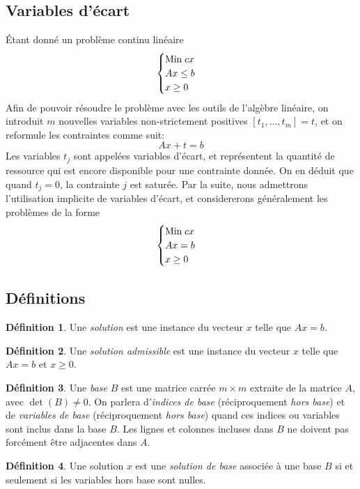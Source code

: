 \documentclass[a4paper]{report}
\theoremstyle{definition}
\newtheorem*{definition}{Définition}
\theoremstyle{remark}
\theoremstyle{plain}
\begin{document}
\subsection{Variables d'écart}
Étant donné un problème continu linéaire
\[\begin{cases}
\text{Min\;} cx \\
Ax \le b \\
x \ge 0
\end{cases}\]
Afin de pouvoir résoudre le problème avec les outils de l'algèbre linéaire, on
introduit \(m\) nouvelles variables non-strictement positives
\([t_1,\dots,t_m]=t\), et on reformule les contraintes comme suit:
\[Ax+t=b\]
Les variables \(t_j\) sont appelées variables d'écart, et représentent la
quantité de ressource qui est encore disponible pour une contrainte donnée.
On en déduit que quand \(t_j=0\), la contrainte \(j\) est saturée.
Par la suite, nous admettrons l'utilisation implicite de variables d'écart,
et considererons généralement les problèmes de la forme
\[\begin{cases}
\text{Min\;} cx \\
Ax = b \\
x \ge 0
\end{cases}\]

\subsection{Définitions}
\begin{definition}
Une \emph{solution} est une instance du vecteur \(x\) telle que \(Ax=b\).
\end{definition}

\begin{definition}
Une \emph{solution admissible} est une instance du
vecteur \(x\) telle que \(Ax=b\) et \(x \ge 0\).
\end{definition}

\begin{definition}
Une \emph{base} \(B\) est une matrice carrée \(m\times
m\) extraite de la matrice \(A\), avec \(\det(B)\ne 0\). On parlera
d'\emph{indices de base} (réciproquement \emph{hors base}) et de \emph{variables
de base} (réciproquement \emph{hors base}) quand ces indices ou variables sont
inclus dans la base \(B\). Les lignes et colonnes incluses dans \(B\) ne doivent
pas forcément être adjacentes dans \(A\).
\end{definition}

\begin{definition}
Une solution \(x\) est une \emph{solution de base}
associée à une base \(B\) si et seulement si les variables hors base sont
nulles.
\end{definition}
\end{document}
